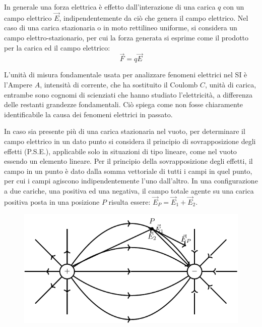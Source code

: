 \documentclass{article}
\numberwithin{equation}{subsection}
\begin{document}
In generale una forza elettrica è effetto dall'interazione di una carica $q$ con un campo elettrico $\vec{E}$, indipendentemente da ciò che genera il campo elettrico. Nel 
caso di una carica stazionaria o in moto rettilineo uniforme, si considera un campo elettro-stazionario, per cui la forza generata si esprime come il prodotto per la carica 
ed il campo elettrico: 
\begin{equation}
    \vec{F}=q\vec{E}
\end{equation}

L'unità di misura fondamentale usata per analizzare fenomeni elettrici nel SI è l'Ampere $A$, intensità di corrente, che ha sostituito il Coulomb $C$, unità di carica, 
entrambe sono cognomi di scienziati che hanno studiato l'elettricità, a differenza delle restanti grandezze fondamentali. Ciò spiega come non fosse chiaramente 
identificabile la causa dei fenomeni elettrici in passato. 


In caso sia presente più di una carica stazionaria nel vuoto, per determinare il campo elettrico in un dato punto si considera il principio di sovrapposizione degli effetti 
(P.S.E.), applicabile solo in situazioni di tipo lineare, come nel vuoto essendo un elemento lineare. Per il principio della sovrapposizione degli effetti, il campo in un 
punto è dato dalla somma vettoriale di tutti i campi in quel punto, per cui i campi agiscono indipendentemente l'uno dall'altro. In una configurazione a due cariche, una 
positiva ed una negativa, il campo totale agente su una carica positiva posta in una posizione $P$ risulta essere: $\vec{E}_P=\vec{E}_1+\vec{E}_2$. 
\begin{figure}[H]%
    \centering
    \includegraphics{sovrapposizione-campi-elettrici.pdf}
    \label{fig:sovrapposizione-campi-elettrici}
\end{figure}
\end{document}

